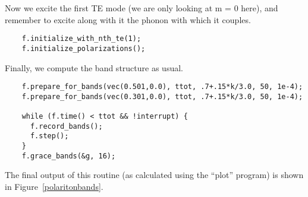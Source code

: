 Now we excite the first TE mode (we are only looking at m = 0 here), and
remember to excite along with it the phonon with which it couples.

\begin{verbatim}
    f.initialize_with_nth_te(1);
    f.initialize_polarizations();
\end{verbatim}

Finally, we compute the band structure as usual.

\begin{verbatim}
    f.prepare_for_bands(vec(0.501,0.0), ttot, .7+.15*k/3.0, 50, 1e-4);
    f.prepare_for_bands(vec(0.301,0.0), ttot, .7+.15*k/3.0, 50, 1e-4);
    
    while (f.time() < ttot && !interrupt) {
      f.record_bands();
      f.step();
    }
    f.grace_bands(&g, 16);
\end{verbatim}
\begin{comment}
  }
}
\end{comment}

The final output of this routine (as calculated using the ``plot'' program)
is shown in Figure~\ref{polaritonbands}.
